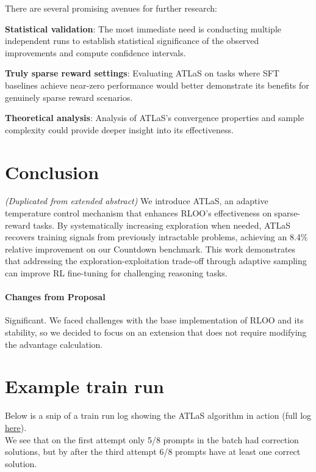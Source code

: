 \documentclass{article}
\begin{document}
There are several promising avenues for further research:

\textbf{Statistical validation}: The most immediate need is conducting multiple independent runs to establish statistical significance of the observed improvements and compute confidence intervals.

\textbf{Truly sparse reward settings}: Evaluating ATLaS on tasks where SFT baselines achieve near-zero performance would better demonstrate its benefits for genuinely sparse reward scenarios.

\textbf{Theoretical analysis}: Analysis of ATLaS's convergence properties and sample complexity could provide deeper insight into its effectiveness.

\section{Conclusion}

\textit{(Duplicated from extended abstract)} We introduce ATLaS, an adaptive temperature control mechanism that enhances RLOO's effectiveness on sparse-reward tasks. By systematically increasing exploration when needed, ATLaS recovers training signals from previously intractable problems, achieving an 8.4\% relative improvement on our Countdown benchmark. This work demonstrates that addressing the exploration-exploitation trade-off through adaptive sampling can improve RL fine-tuning for challenging reasoning tasks.

\paragraph{Changes from Proposal} Significant. We faced challenges with the base implementation of RLOO and its stability, so we decided to focus on an extension that does not require modifying the advantage calculation.




\appendix

\section{Example train run}
\label{app:log}

Below is a snip of a train run log showing the ATLaS algorithm in action (full log \href{https://wandb.ai/jonathanalgar/countdown-rl-prod/runs/o14gnkyy/logs}{here}).\\
We see that on the first attempt only 5/8 prompts in the batch had correction solutions, but by after the third attempt 6/8 prompts have at least one correct solution. 
\end{document}
